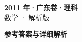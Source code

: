 \documentclass[zihao=-4, a4paper]{ctexart}
\begin{document}
\begin{center}
  {\Large\bfseries 2011 年·广东卷·理科}\\[4pt]
  {\large 数学 · 解析版}
\end{center}
\medskip
{}

\clearpage
{}
\begin{center}{\Large\bfseries 参考答案与详细解析}\end{center}
\medskip

\end{document}
